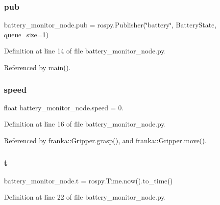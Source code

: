 \subsubsection{\texorpdfstring{pub}{pub}}
{\footnotesize\ttfamily battery\+\_\+monitor\+\_\+node.\+pub = rospy.\+Publisher(\char`\"{}battery\char`\"{}, Battery\+State, queue\+\_\+size=1)}



Definition at line 14 of file battery\+\_\+monitor\+\_\+node.\+py.



Referenced by main().

\mbox{\label{namespacebattery__monitor__node_a78ba7243610b635b1712c5af728edc13}} 
\subsubsection{\texorpdfstring{speed}{speed}}
{\footnotesize\ttfamily float battery\+\_\+monitor\+\_\+node.\+speed = 0.}



Definition at line 16 of file battery\+\_\+monitor\+\_\+node.\+py.



Referenced by franka\+::\+Gripper.\+grasp(), and franka\+::\+Gripper.\+move().

\mbox{\label{namespacebattery__monitor__node_a7a63d20d1ea461e280f4eb5b47f925cd}} 
\subsubsection{\texorpdfstring{t}{t}}
{\footnotesize\ttfamily battery\+\_\+monitor\+\_\+node.\+t = rospy.\+Time.\+now().to\+\_\+time()}



Definition at line 22 of file battery\+\_\+monitor\+\_\+node.\+py.



